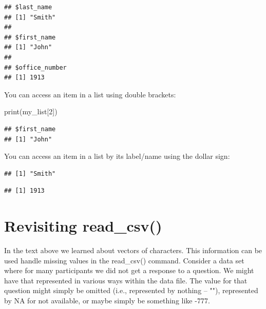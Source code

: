 \documentclass[
]{krantz}
\makeatletter
\newenvironment{Shaded}{\begin{snugshade}}{\end{snugshade}}
\newcommand{\DecValTok}[1]{\textcolor[rgb]{0.06,0.06,0.06}{#1}}
\newcommand{\FunctionTok}[1]{\textcolor[rgb]{0,0,0}{#1}}
\newcommand{\NormalTok}[1]{#1}
\newcommand{\SpecialCharTok}[1]{\textcolor[rgb]{0,0,0}{#1}}
\newenvironment{kframe}{%
\medskip{}
\setlength{\fboxsep}{.8em}
 \def\at@end@of@kframe{}%
 \ifinner\ifhmode%
  \def\at@end@of@kframe{\end{minipage}}%
  \begin{minipage}{\columnwidth}%
 \fi\fi%
 \def\FrameCommand##1{\hskip\@totalleftmargin \hskip-\fboxsep
 \colorbox{shadecolor}{##1}\hskip-\fboxsep
     \hskip-\linewidth \hskip-\@totalleftmargin \hskip\columnwidth}%
 \MakeFramed {\advance\hsize-\width
   \@totalleftmargin\z@ \linewidth\hsize
   \@setminipage}}%
 {\par\unskip\endMakeFramed%
 \at@end@of@kframe}
\renewenvironment{Shaded}{\begin{kframe}}{\end{kframe}}
\makeatother
\begin{document}
\begin{verbatim}
## $last_name
## [1] "Smith"
## 
## $first_name
## [1] "John"
## 
## $office_number
## [1] 1913
\end{verbatim}

You can access an item in a list using double brackets:

\begin{Shaded}
\begin{Highlighting}[]
\FunctionTok{print}\NormalTok{(my\_list[}\DecValTok{2}\NormalTok{])}
\end{Highlighting}
\end{Shaded}

\begin{verbatim}
## $first_name
## [1] "John"
\end{verbatim}

You can access an item in a list by its label/name using the dollar sign:

\begin{Shaded}
\end{Shaded}

\begin{verbatim}
## [1] "Smith"
\end{verbatim}

\begin{Shaded}
\end{Shaded}

\begin{verbatim}
## [1] 1913
\end{verbatim}

\hypertarget{revisiting-read_csv}{%
\section{Revisiting read\_csv()}\label{revisiting-read_csv}}

In the text above we learned about vectors of characters. This information can be used handle missing values in the read\_csv() command. Consider a data set where for many participants we did not get a response to a question. We might have that represented in various ways within the data file. The value for that question might simply be omitted (i.e., represented by nothing -- ""), represented by NA for not available, or maybe simply be something like -777.
\end{document}
